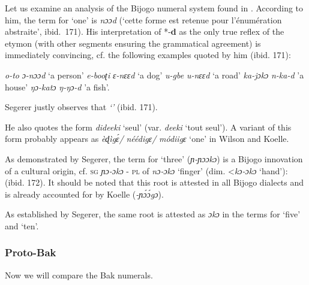 Let us examine an analysis of the Bijogo numeral system found in \citep{Segerer2002}. According to him, the term for ‘one’ is \textit{nɔɔd} (‘cette forme est retenue pour l’énumération abstraite’, ibid.~171). His interpretation of *-\textbf{d} as the only true reflex of the etymon (with other segments ensuring the grammatical agreement) is immediately convincing, cf. the following examples quoted by him (ibid. 171):

\ea
\ea \textit{o-to} \textit{ɔ-nɔɔd} ‘a person’
\ex \textit{e-booʈi} \textit{ɛ-nɛɛd} ‘a dog’
\ex \textit{u-gbe} \textit{u-nɛɛd} ‘a road’
\ex \textit{ka-jɔkɔ} \textit{n-ka-d} ’a house’
\ex \textit{ŋɔ-katɔ} \textit{ŋ-ŋɔ-d} ’a fish’.
\z
\z

Segerer justly observes that \textit{‘}\textit{’} (ibid. 171).

He also quotes the form \textit{dideeki} ‘seul’ (var. \textit{deeki} ‘tout seul’). A variant of this form probably appears as  \textit{èɖìg{\'{ɛ}}/} \textit{néédigɛ/} \textit{módiigɛ} ‘one’ in Wilson and Koelle.

As demonstrated by Segerer, the term for ‘three’ (\textit{ɲ-ɲɔɔkɔ}) is a Bijogo innovation of a cultural origin, cf. \textsc{sg}  \textit{ɲɔ-ɔkɔ} - \textsc{pl} of \textit{nɔ-ɔkɔ} ‘finger’ (dim. <\textit{kɔ-ɔkɔ} ‘hand’): (ibid. 172). It should be noted that this root is attested in all Bijogo dialects and is already accounted for by Koelle (\textit{-ɲ{\'{ɔ}}{\'{ɔ}}gɔ}).

As established by Segerer, the same root is attested as \textit{ɔkɔ} in the terms for ‘five’ and ‘ten’. 

\clearpage 
\subsubsection{Proto-Bak}%
Now we will compare the Bak numerals.


